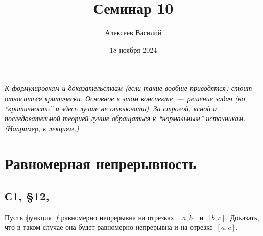 \documentclass[a4paper,12pt]{article}
\author{Алексеев Василий}
\title{Семинар 10}
\date{18 ноября 2024}
\begin{document}
  \maketitle
  
  \tableofcontents

  \thispagestyle{empty}
  
  \newpage
  
  
  
  \vspace*{\fill}
  
  \noindent
  \emph{
    К формулировкам и доказательствам (если такие вообще приводятся) стоит относиться критически.
    Основное в этом конспекте~---~решение задач (но ``критичность'' и здесь лучше не отключать).
    За строгой, ясной и последовательной теорией лучше обращаться к ``нормальным'' источникам.
    (Например, к лекциям.)
  }
  
  \vspace*{\fill}
  
  \thispagestyle{empty}
  
  \newpage
  
  


  \section{Равномерная непрерывность}
  
  
  
  
  
  \subsection{С1, \S 12, }
  \label{p:1-12-17}
  
  Пусть функция~$f$ равномерно непрерывна на отрезках~$[a, b]$ и~$[b, c]$.
  Доказать, что в таком случае она будет равномерно непрерывна и на отрезке~$[a, c]$.
  
\end{document}
